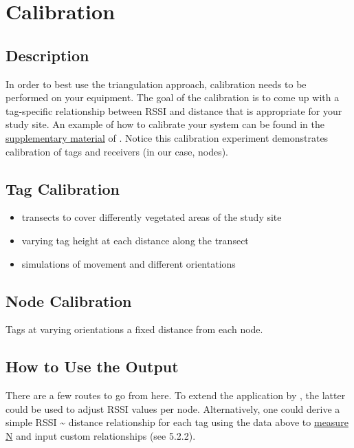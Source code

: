 \documentclass[
]{book}
\providecommand{\tightlist}{%
  \setlength{\itemsep}{0pt}\setlength{\parskip}{0pt}}
\begin{document}
\chapter{Calibration}\label{calibration}

\section{Description}\label{description}

In order to best use the triangulation approach, calibration needs to be performed on your equipment. The goal of the calibration is to come up with a tag-specific relationship between RSSI and distance that is appropriate for your study site. An example of how to calibrate your system can be found in the \href{https://academic.oup.com/beheco/article/31/4/873/5840921?login=true\#supplementary-data}{supplementary material} of \citet{bircher2020extraterritorial}. Notice this calibration experiment demonstrates calibration of tags and receivers (in our case, nodes).

\section{Tag Calibration}\label{tag-calibration}

\begin{itemize}
\tightlist
\item
  transects to cover differently vegetated areas of the study site\\
\item
  varying tag height at each distance along the transect\\
\item
  simulations of movement and different orientations
\end{itemize}

\section{Node Calibration}\label{node-calibration}

Tags at varying orientations a fixed distance from each node.

\section{How to Use the Output}\label{how-to-use-the-output}

There are a few routes to go from here. To extend the application by \citet{bircher2020extraterritorial}, the latter could be used to adjust RSSI values per node. Alternatively, one could derive a simple RSSI \textasciitilde{} distance relationship for each tag using the data above to \href{https://iotandelectronics.wordpress.com/2016/10/07/how-to-calculate-distance-from-the-rssi-value-of-the-ble-beacon/}{measure N} and input custom relationships (see 5.2.2).
\end{document}
